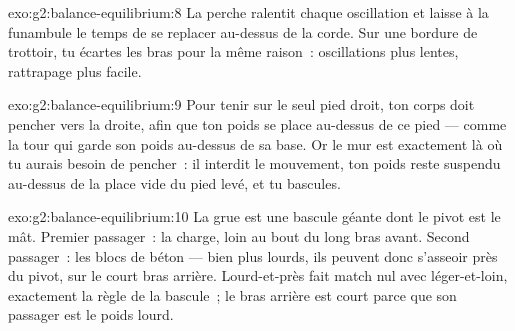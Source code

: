 \begin{solution}{exo:g2:balance-equilibrium:8}
La perche ralentit chaque oscillation et laisse à la funambule le
temps de se replacer au-dessus de la corde. Sur une bordure de
trottoir, tu écartes les bras pour la même raison~: oscillations plus
lentes, rattrapage plus facile.
\end{solution}

\begin{solution}{exo:g2:balance-equilibrium:9}
Pour tenir sur le seul pied droit, ton corps doit pencher vers la
droite, afin que ton poids se place au-dessus de ce pied --- comme la
tour qui garde son poids au-dessus de sa base. Or le mur est
exactement là où tu aurais besoin de pencher~: il interdit le
mouvement, ton poids reste suspendu au-dessus de la place vide du
pied levé, et tu bascules.
\end{solution}

\begin{solution}{exo:g2:balance-equilibrium:10}
La grue est une bascule géante dont le pivot est le mât. Premier
passager~: la charge, loin au bout du long bras avant. Second
passager~: les blocs de béton --- bien plus lourds, ils peuvent donc
s'asseoir près du pivot, sur le court bras arrière. Lourd-et-près
fait match nul avec léger-et-loin, exactement la règle de la
bascule~; le bras arrière est court parce que son passager est le
poids lourd.
\end{solution}
